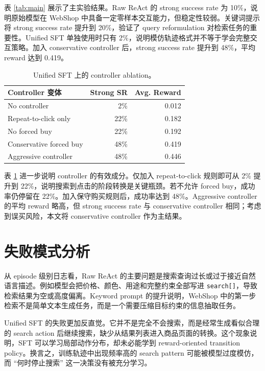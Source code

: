 \documentclass[11pt]{article}
\begin{document}
表 \ref{tab:main} 展示了主实验结果。Raw ReAct 的 strong success rate 为 10\%，说明原始模型在 WebShop 中具备一定零样本交互能力，但稳定性较弱。关键词提示将 strong success rate 提升到 20\%，验证了 query reformulation 对检索任务的重要性。Unified SFT 单独使用时只有 2\%，说明模仿轨迹格式并不等于学会完整交互策略。加入 conservative controller 后，strong success rate 提升到 48\%，平均 reward 达到 0.419。

\begin{table}[t]
\centering
\small
\begin{tabularx}{\linewidth}{lrr}
\toprule
Controller 变体 & Strong SR & Avg. Reward \\
\midrule
No controller & 2\% & 0.012 \\
Repeat-to-click only & 22\% & 0.182 \\
No forced buy & 22\% & 0.192 \\
Conservative forced buy & 48\% & 0.419 \\
Aggressive controller & 48\% & 0.446 \\
\bottomrule
\end{tabularx}
\caption{Unified SFT 上的 controller ablation。}
\label{tab:ablation}
\end{table}

表 \ref{tab:ablation} 进一步说明 controller 的有效成分。仅加入 repeat-to-click 规则即可从 2\% 提升到 22\%，说明搜索到点击的阶段转换是关键瓶颈。若不允许 forced buy，成功率仍停留在 22\%。加入保守购买规则后，成功率达到 48\%。Aggressive controller 的平均 reward 略高，但 strong success rate 与 conservative controller 相同；考虑到误买风险，本文将 conservative controller 作为主结果。

\section{失败模式分析}

从 episode 级别日志看，Raw ReAct 的主要问题是搜索查询过长或过于接近自然语言描述。例如模型会把价格、颜色、用途和完整约束全部写进 \texttt{search[]}，导致检索结果为空或高度偏离。Keyword prompt 的提升说明，WebShop 中的第一步检索不是简单文本生成任务，而是一个需要压缩目标约束的信息抽取任务。

Unified SFT 的失败更加反直觉。它并不是完全不会搜索，而是经常生成看似合理的 search action 后继续搜索，缺少从结果列表进入商品页面的转换。这个现象说明，SFT 可以学习局部动作分布，却未必能学到 reward-oriented transition policy。换言之，训练轨迹中出现频率高的 search pattern 可能被模型过度模仿，而 ``何时停止搜索'' 这一决策没有被充分学习。
\end{document}
